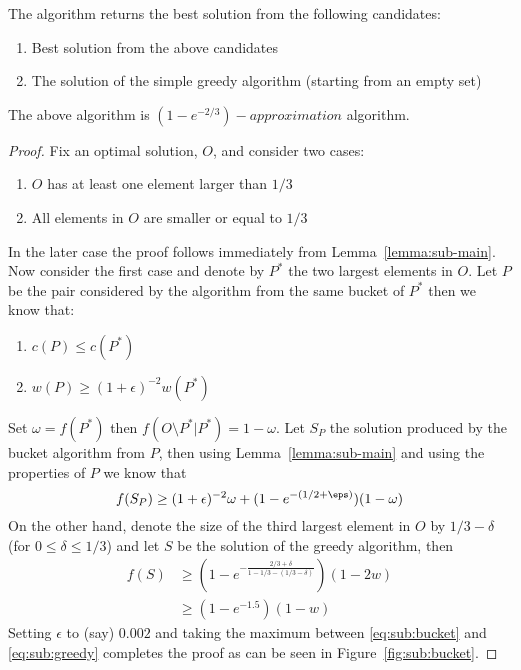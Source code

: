 The algorithm returns the best solution from the following candidates:
\begin{enumerate}
  \item Best solution from the above candidates
  \item The solution of the simple greedy algorithm (starting from an empty set)
\end{enumerate}       

\begin{theorem}
The above algorithm is $(1 - e^{-2/3})-approximation$ algorithm.
\end{theorem}

\begin{proof}
Fix an optimal solution, $O$, and consider two cases:
\begin{enumerate}
  \item $O$ has at least one element larger than $1/3$
  \item All elements in $O$ are smaller or equal to $1/3$
\end{enumerate}
In the later case the proof follows immediately from Lemma~\ref{lemma:sub-main}.
Now consider the first case and denote by $P^*$ the two largest elements in $O$.
Let $P$ be the pair considered by the algorithm from the same bucket of $P^*$ then we know
that:
\begin{enumerate}
  \item $c(P) \leq c(P^*)$
  \item $w(P) \geq (1 + \epsilon)^{-2}w(P^*)$
\end{enumerate}
Set $\omega = f(P^*)$ then $f(O\setminus P^* | P^*) = 1 - \omega$.
Let $S_P$ the solution produced by the bucket algorithm from $P$, 
then using Lemma~\ref{lemma:sub-main} and using the properties of $P$ we know that
\begin{equation}
\label{eq:sub:bucket}
f(S_P) \geq (1 + \epsilon)^{-2}\omega + (1-e^{-(1/2 + \eps)})(1 - \omega)
\end{equation}
On the other hand, denote the size of the third largest element in $O$ by $1/3 - \delta$
(for $0 \leq \delta \leq 1/3$) and  let $S$ be the solution of the greedy algorithm, then 
\begin{align}
\label{eq:sub:greedy}
f(S) & \geq (1 - e^{-\frac{2/3 + \delta}{1 - 1/3 - (1/3 - \delta)}})(1 - 2w) 
\\
& \geq (1 - e^{-1.5})(1-w)
\end{align}
Setting $\epsilon$ to (say) $0.002$ and taking the maximum between \ref{eq:sub:bucket} and
\ref{eq:sub:greedy} completes the proof as can be seen in Figure~\ref{fig:sub:bucket}.
\end{proof}

